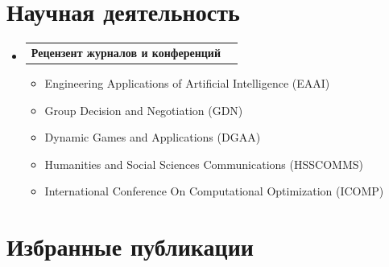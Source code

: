\documentclass[letterpaper,10pt]{article}
\makeatletter
\newcommand{\resumeItem}[1]{
  \item\small{
    {#1 \vspace{-2pt}}
  }
}
\newcommand{\resumeProjectHeading}[2]{
  \item
  \begin{tabular*}{0.97\textwidth}{l@{\extracolsep{\fill}}r}
    \small#1 & #2 \\
  \end{tabular*}\vspace{-7pt}
}
\newenvironment{resumeSubHeadingList}{\begin{itemize}[leftmargin=0.15in, label={}]}{\end{itemize}}
\newenvironment{resumeItemList}{\begin{itemize}}{\end{itemize}}
\makeatother
\begin{document}
\section{Научная деятельность}
\begin{resumeSubHeadingList}
  \resumeProjectHeading{{\bf Рецензент журналов и конференций}}{}
  \begin{resumeItemList}
    \resumeItem{Engineering Applications of Artificial Intelligence (EAAI)}
    \resumeItem{Group Decision and Negotiation (GDN)}
    \resumeItem{Dynamic Games and Applications (DGAA)}
    \resumeItem{Humanities and Social Sciences Communications (HSSCOMMS)}
    \resumeItem{International Conference On Computational Optimization (ICOMP)}
  \end{resumeItemList}
\end{resumeSubHeadingList}
\section{Избранные публикации}
\end{document}
